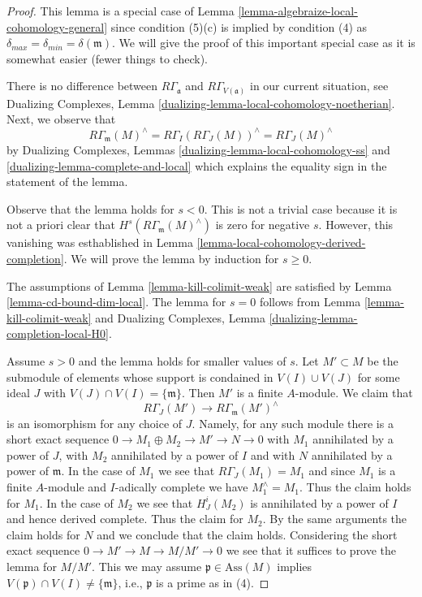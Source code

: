 \begin{proof}
This lemma is a special case of
Lemma \ref{lemma-algebraize-local-cohomology-general}
since condition (5)(c) is implied by condition (4)
as $\delta_{max} = \delta_{min} = \delta(\mathfrak m)$.
We will give the proof of this important special case
as it is somewhat easier (fewer things to check).

\medskip\noindent
There is no difference between $R\Gamma_\mathfrak a$ and
$R\Gamma_{V(\mathfrak a)}$ in our current situation, see
Dualizing Complexes, Lemma \ref{dualizing-lemma-local-cohomology-noetherian}.
Next, we observe that
$$
R\Gamma_\mathfrak m(M)^\wedge =
R\Gamma_I(R\Gamma_J(M))^\wedge =
R\Gamma_J(M)^\wedge
$$
by Dualizing Complexes, Lemmas \ref{dualizing-lemma-local-cohomology-ss} and
\ref{dualizing-lemma-complete-and-local}
which explains the equality sign in the statement of the lemma.

\medskip\noindent
Observe that the lemma holds for $s < 0$. This is not a trivial case because
it is not a priori clear that $H^s(R\Gamma_\mathfrak m(M)^\wedge)$
is zero for negative $s$. However, this vanishing was esthablished
in Lemma \ref{lemma-local-cohomology-derived-completion}.
We will prove the lemma by induction for $s \geq 0$.

\medskip\noindent
The assumptions of Lemma \ref{lemma-kill-colimit-weak}
are satisfied by Lemma \ref{lemma-cd-bound-dim-local}.
The lemma for $s = 0$ follows from Lemma \ref{lemma-kill-colimit-weak} and
Dualizing Complexes, Lemma \ref{dualizing-lemma-completion-local-H0}.

\medskip\noindent
Assume $s > 0$ and the lemma holds for smaller values of $s$.
Let $M' \subset M$ be the submodule of elements whose
support is condained in $V(I) \cup V(J)$ for some
ideal $J$ with $V(J) \cap V(I) = \{\mathfrak m\}$.
Then $M'$ is a finite $A$-module.
We claim that
$$
R\Gamma_J(M') \to R\Gamma_\mathfrak m(M')^\wedge
$$
is an isomorphism for any choice of $J$.
Namely, for any such module there is a short exact sequence
$0 \to M_1 \oplus M_2 \to M' \to N \to 0$ with
$M_1$ annihilated by a power of $J$, with $M_2$ annihilated
by a power of $I$ and with $N$ annihilated by a power of $\mathfrak m$.
In the case of $M_1$ we see that $R\Gamma_J(M_1) = M_1$ and
since $M_1$ is a finite $A$-module and $I$-adically complete
we have $M_1^\wedge = M_1$. Thus the claim holds for $M_1$.
In the case of $M_2$ we see that $H^i_J(M_2)$ is annihilated
by a power of $I$ and hence derived complete. Thus the claim
for $M_2$. By the same arguments the claim holds for $N$
and we conclude that the claim holds. Considering the
short exact sequence $0 \to M' \to M \to M/M' \to 0$
we see that it suffices to prove the lemma for $M/M'$.
This we may assume $\mathfrak p \in \text{Ass}(M)$
implies $V(\mathfrak p) \cap V(I) \not = \{\mathfrak m\}$, i.e.,
$\mathfrak p$ is a prime as in (4).


\end{proof}

